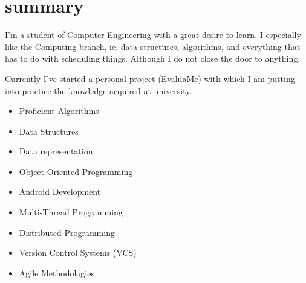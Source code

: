 \documentclass[]{friggeri-cv} %
\begin{document}
\begin{aside}
\begin{comment}
 \section{personality}
Java\quad{\color{blue} $\varheartsuit\varheartsuit\varheartsuit\varheartsuit$}{\color{black} $\varheartsuit\varheartsuit$}
Python\quad{\color{blue} $\varheartsuit\varheartsuit\varheartsuit\varheartsuit$}{\color{black} $\varheartsuit\varheartsuit$}
JavaScript\quad{\color{blue} $\varheartsuit\varheartsuit\varheartsuit\varheartsuit$}{\color{black} $\varheartsuit\varheartsuit$}
 C\quad{\color{blue} $\varheartsuit\varheartsuit\varheartsuit\varheartsuit$}{\color{black} $\varheartsuit\varheartsuit$}
 C++\quad{\color{blue} $\varheartsuit\varheartsuit\varheartsuit\varheartsuit$}{\color{black} $\varheartsuit\varheartsuit$}
 \end{comment}
\end{aside}




\section{summary}



I'm a student of Computer Engineering with a great desire to learn. I especially like the Computing branch, ie, data structures, algorithms, and everything that has to do with scheduling things. Although I do not close the door to anything.

Currently I've started a personal project (EvaluaMe) with which I am putting into practice the knowledge acquired at university.

\noindent\begin{minipage}[t]{0.5\linewidth}
    \begin{itemize}
    	\item{Proficient Algorithms}
	\item{Data Structures}
    	\item{Data representation}
    	\item{Object Oriented Programming}
    	\item{Android Development}

    \end{itemize}
    \end{minipage}%
    \begin{minipage}[t]{0.5\linewidth}
    \begin{itemize}
    	\item{Multi-Thread Programming}
    	\item{Distributed Programming}
   	\item{Version Control Systems (VCS)}
   	\item{Agile Methodologies}
    \end{itemize}
\end{minipage}\par\bigskip
\end{document}
